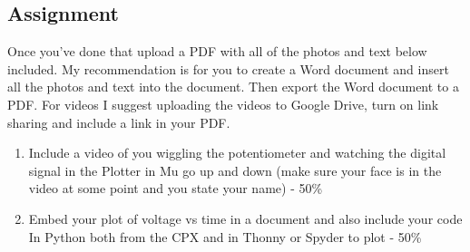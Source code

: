 \subsection{Assignment}

Once you've done that upload a PDF with all of the photos and text below included. My recommendation is for you to create a Word document and insert all the photos and text into the document. Then export the Word document to a PDF. For videos I suggest uploading the videos to Google Drive, turn on link sharing and include a link in your PDF.

\begin{enumerate}[itemsep=-5pt]
\item Include a video of you wiggling the potentiometer and watching the digital signal in the Plotter in Mu go up and down (make sure your face is in the video at some point and you state your name) - 50\%
\item Embed your plot of voltage vs time in a document and also include your code In Python both from the CPX and in Thonny or Spyder to plot - 50\%
\end{enumerate}